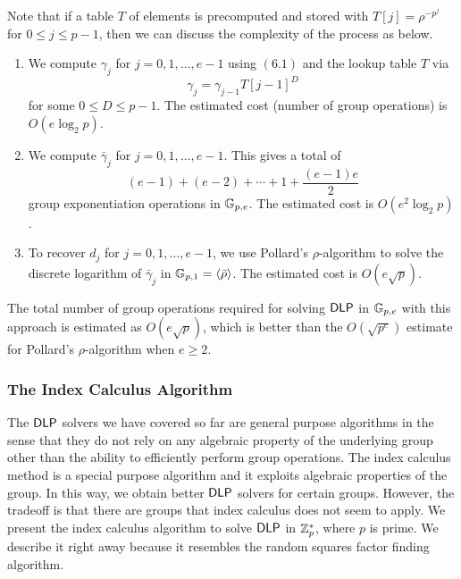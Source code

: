 Note that if a table $T$ of elements is precomputed and stored with $T[j] 
= \rho^{-p^j}$ for $0 \leq j \leq p-1$, then we can discuss the complexity of 
the process as below. 
\begin{enumerate}
      \item We compute $\gamma_j$ for $j = 0, 1, \dots, e-1$ using $(6.1)$ 
            and the lookup table $T$ via 
            \[ \gamma_j = \gamma_{j-1} T[j-1]^D \] 
            for some $0 \leq D \leq p-1$. The estimated cost (number of group 
            operations) is $O(e\log_2 p)$. 
      \item We compute $\bar\gamma_j$ for $j = 0, 1, \dots, e-1$. This gives a 
            total of 
            \[ (e-1) + (e-2) + \cdots + 1 + \frac{(e-1)e}2 \] 
            group exponentiation operations in $\mathbb{G}_{p,e}$. The estimated cost is 
            $O(e^2\log_2 p)$. 
      \item To recover $d_j$ for $j = 0, 1, \dots, e-1$, we use Pollard's 
            $\rho$-algorithm to solve the discrete logarithm of $\bar\gamma_j$ 
            in $\mathbb{G}_{p,1} = \langle \bar\rho \rangle$. The estimated cost is 
            $O(e\sqrt p)$. 
\end{enumerate}
The total number of group operations required for solving ${\sf DLP}$ in $\mathbb{G}_{p,e}$ 
with this approach is estimated as $O(e\sqrt p)$, which is better than the 
$O(\sqrt{p^e})$ estimate for Pollard's $\rho$-algorithm when $e \geq 2$. 

\subsubsection{The Index Calculus Algorithm}
The ${\sf DLP}$ solvers we have covered so far are general purpose algorithms in the 
sense that they do not rely on any algebraic property of the underlying group 
other than the ability to efficiently perform group operations. The index calculus 
method is a special purpose algorithm and it exploits algebraic properties of the 
group. In this way, we obtain better ${\sf DLP}$ solvers for certain groups. However, 
the tradeoff is that there are groups that index calculus does not seem to apply.
We present the index calculus algorithm to solve ${\sf DLP}$ in $\mathbb{Z}_p^*$, where 
$p$ is prime. We describe it right away because it resembles the 
random squares factor finding algorithm. 

